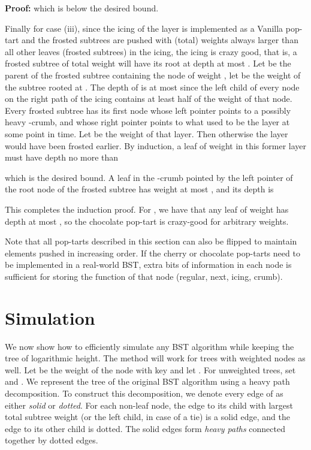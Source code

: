 \documentclass[11pt]{article}
\newenvironment{proof}{\noindent\textbf{Proof: }\ignorespaces}
  {\hspace*{\fill}\medskip}
\begin{document}
\begin{proof}
which is below the desired bound.

Finally for case (iii), since the icing of the  layer is
implemented as a Vanilla pop-tart and the frosted subtrees are pushed
with (total) weights always larger than all other leaves (frosted
subtrees) in the icing, the icing is crazy good, that is, a frosted
subtree of total weight  will have its root at depth at most 
. 
Let  be the parent of the frosted subtree containing the node of
weight , let  be the
weight of the subtree rooted at . The depth of  is at most 
 since the left child of every node on the right
path of the icing contains at least half of the weight of that node.  
Every frosted subtree has its first node whose left pointer points to
a possibly heavy -crumb, and whose right pointer points to what
used to be the  layer at some point in time. Let  be the
weight of that  layer. Then  otherwise the
 layer would have been frosted earlier. 
By induction, a leaf of weight  in this former  layer must
have depth no more than 



which is the desired bound. 
A leaf in the -crumb pointed by the left pointer of the root node
of the frosted subtree has weight at most , and its depth is

This completes the induction proof. For , we have that any leaf
of weight  has depth at most , so the chocolate
pop-tart is crazy-good for arbitrary weights. 
\end{proof}

Note that all pop-tarts described in this section can also be flipped
to maintain elements pushed in increasing order. If the cherry or
chocolate pop-tarts need to be implemented in a real-world BST,
 extra bits of information in each node is sufficient
for storing the function of that node (regular, next, icing, crumb). 

\section{Simulation}\label{sec:simulation}
We now show how to efficiently simulate any BST algorithm while keeping
the tree of logarithmic height. The method will work for trees with
weighted nodes as well. Let  be the weight of the node with key 
and let .  For unweighted trees, set  and
.  We represent the tree  of the original BST algorithm using a
heavy path decomposition. To construct this decomposition, we denote
every edge of  as either \emph{solid} or \emph{dotted}. For each
non-leaf node, the edge to its child with largest total subtree weight
(or the left child, in case of a tie) is a solid edge, and the edge to
its other child is dotted. The solid edges form \emph{heavy paths}
connected together by dotted edges.
\end{document}
